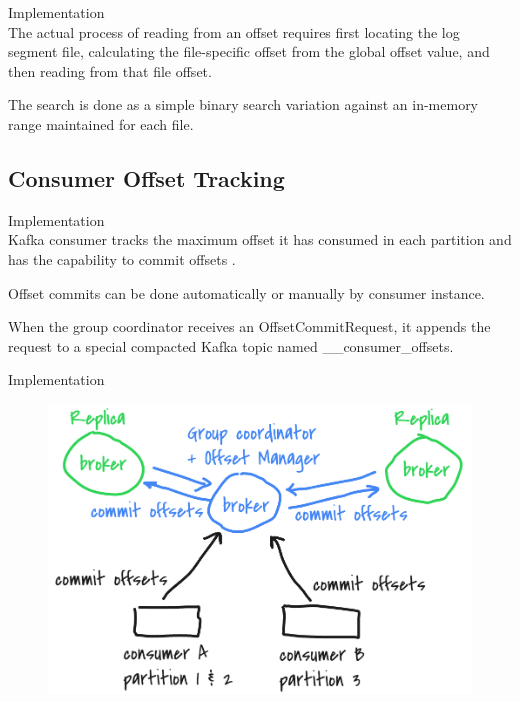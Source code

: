 \begin{frame}[plain,t]{Implementation} %
     \\
    \vspace{2ex}
   The actual process of reading from an offset requires first locating the log segment file, calculating the file-specific offset from the global offset value, and then reading from that file offset. 
   
   \vspace{2ex}
   The search is done as a simple binary search variation against an in-memory range maintained for each file.
    
    
\end{frame}
\subsection{Consumer Offset Tracking}
\begin{frame}[plain,t]{Implementation} %
     \\
    \vspace{2ex}
    Kafka consumer tracks the maximum offset it has consumed in each partition and has the capability to commit offsets .
    
    \vspace{2ex}
    Offset commits can be done automatically or manually by consumer instance.
    
    
    \vspace{2ex}
    When the group coordinator receives an OffsetCommitRequest, it appends the request to a special compacted Kafka topic named \_\_consumer\_offsets.
    
    
\end{frame}
\begin{frame}[plain,t]{Implementation} %
     \\
    \vspace{2ex}
   \begin{figure}
       \centering
       \includegraphics[width=0.7\linewidth]{image/0306}
       \label{fig:0306}
   \end{figure}
   
    
\end{frame}

